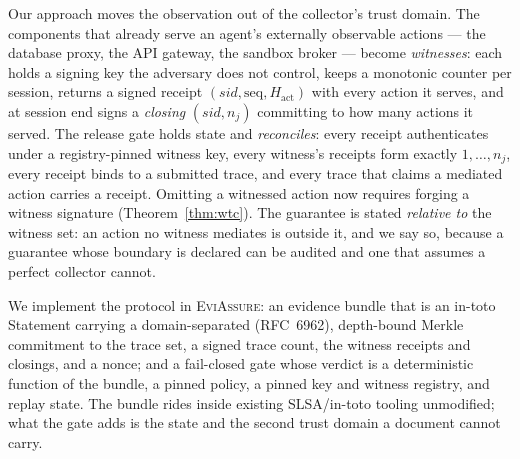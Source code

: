 Our approach moves the observation out of the collector's trust domain. The
components that already serve an agent's externally observable actions --- the
database proxy, the API gateway, the sandbox broker --- become
\emph{witnesses}: each holds a signing key the adversary does not control,
keeps a monotonic counter per session, returns a signed receipt
$(\mathit{sid}, \mathrm{seq}, H_{\mathrm{act}})$ with every action it serves,
and at session end signs a \emph{closing} $(\mathit{sid}, n_j)$ committing to
how many actions it served. The release gate holds state and
\emph{reconciles}: every receipt authenticates under a registry-pinned witness
key, every witness's receipts form exactly $1,\dots,n_j$, every receipt binds
to a submitted trace, and every trace that claims a mediated action carries a
receipt. Omitting a witnessed action now requires forging a witness signature
(Theorem~\ref{thm:wtc}). The guarantee is stated \emph{relative to} the witness
set: an action no witness mediates is outside it, and we say so, because a
guarantee whose boundary is declared can be audited and one that assumes a
perfect collector cannot.

We implement the protocol in \textsc{EviAssure}: an evidence bundle that is an
in-toto Statement carrying a domain-separated (RFC~6962), depth-bound Merkle
commitment to the trace set, a signed trace count, the witness receipts and
closings, and a nonce; and a fail-closed gate whose verdict is a deterministic
function of the bundle, a pinned policy, a pinned key and witness registry, and
replay state. The bundle rides inside existing SLSA/in-toto tooling
unmodified; what the gate adds is the state and the second trust domain a
document cannot carry.

